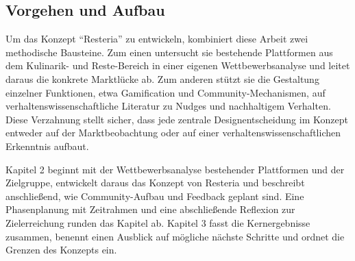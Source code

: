 \subsection{Vorgehen und Aufbau}\label{sec:vorgehen_und_aufbau}

Um das Konzept \enquote{Resteria} zu entwickeln, kombiniert diese Arbeit zwei methodische Bausteine. Zum einen untersucht sie bestehende Plattformen aus dem Kulinarik- und Reste-Bereich in einer eigenen Wettbewerbsanalyse und leitet daraus die konkrete Marktlücke ab. Zum anderen stützt sie die Gestaltung einzelner Funktionen, etwa Gamification und Community-Mechanismen, auf verhaltenswissenschaftliche Literatur zu Nudges und nachhaltigem Verhalten. Diese Verzahnung stellt sicher, dass jede zentrale Designentscheidung im Konzept entweder auf der Marktbeobachtung oder auf einer verhaltenswissenschaftlichen Erkenntnis aufbaut.

Kapitel 2 beginnt mit der Wettbewerbsanalyse bestehender Plattformen und der Zielgruppe, entwickelt daraus das Konzept von Resteria und beschreibt anschließend, wie Community-Aufbau und Feedback geplant sind. Eine Phasenplanung mit Zeitrahmen und eine abschließende Reflexion zur Zielerreichung runden das Kapitel ab. Kapitel 3 fasst die Kernergebnisse zusammen, benennt einen Ausblick auf mögliche nächste Schritte und ordnet die Grenzen des Konzepts ein.
